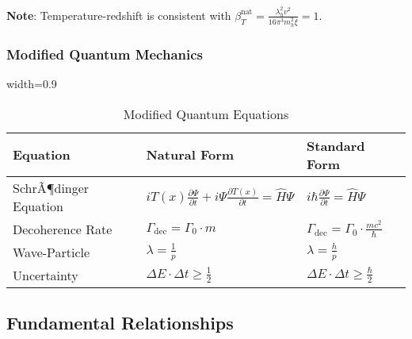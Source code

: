 ﻿\documentclass[12pt,a4paper]{article}
\newcommand{\Tfield}{T(x)}
\newcommand{\tablescale}{0.9}
\begin{document}
\begin{itemize}
	\textbf{Note}: Temperature-redshift is consistent with \(\beta_T^{\text{nat}} = \frac{\lambda_h^2 v^2}{16\pi^3 m_h^2 \xi} = 1\).
	
	\subsubsection{Modified Quantum Mechanics}
	\label{subsec:quantum}
	
	\begin{table}[htbp]
		\centering
		\begin{adjustbox}{width=\tablescale\textwidth}
			\begin{tabular}{lll}
				\toprule
				\textbf{Equation} & \textbf{Natural Form} & \textbf{Standard Form} \\
				\midrule
				SchrÃ¶dinger Equation & \(i \Tfield \frac{\partial \Psi}{\partial t} + i \Psi \frac{\partial \Tfield}{\partial t} = \hat{H} \Psi\) & \(i \hbar \frac{\partial \Psi}{\partial t} = \hat{H} \Psi\) \\
				Decoherence Rate & \(\Gamma_{\text{dec}} = \Gamma_0 \cdot m\) & \(\Gamma_{\text{dec}} = \Gamma_0 \cdot \frac{m c^2}{\hbar}\) \\
				Wave-Particle & \(\lambda = \frac{1}{p}\) & \(\lambda = \frac{h}{p}\) \\
				Uncertainty & \(\Delta E \cdot \Delta t \geq \frac{1}{2}\) & \(\Delta E \cdot \Delta t \geq \frac{\hbar}{2}\) \\
				\bottomrule
			\end{tabular}
		\end{adjustbox}
		\caption{Modified Quantum Equations}
		\label{tab:qm_equations}
	\end{table}
	
	\subsection{Fundamental Relationships}
	\label{subsec:relationships}
	

\end{itemize}
\end{document}
